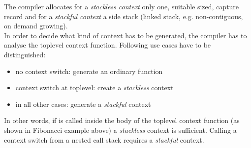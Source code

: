 The compiler allocates for a \emph{stackless context} only one, suitable sized,
capture record and for a \emph{stackful context} a side stack (linked stack,
e.g. non-contiguous, on demand growing).\\
In order to decide what kind of context has to be generated, the compiler has to
analyse the toplevel context function. Following use cases have to be
distinguished:
\begin{itemize}
    \item no context switch: generate an ordinary function
    \item context switch at toplevel: create a \emph{stackless} context
    \item in all other cases: generate a \emph{stackful} context
\end{itemize}
In other words, if \ectxop is called inside the body of the toplevel context
function (as shown in Fibonacci example above) a \emph{stackless} context is
sufficient.
Calling a context switch from a nested call stack requires a \emph{stackful}
context.
